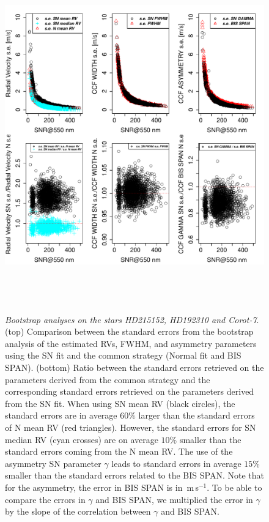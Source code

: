 \documentclass{aa}
\def\ms{\hbox{\,m\,s$^{-1}$}}         %
\begin{document}
\begin{figure}[htbp]
\begin{center}
\includegraphics[height = 6in]{[5]Errors_vs_SNR_all_stars.pdf} 
   \caption{\textit{Bootstrap analyses on the stars HD215152, HD192310 and Corot-7}. (top) Comparison between the standard errors from the bootstrap analysis of the estimated RVs, FWHM, and asymmetry parameters using the SN fit and the common strategy (Normal fit and BIS SPAN). (bottom) Ratio between the standard errors retrieved on the parameters derived from the common strategy and the corresponding standard errors retrieved on the parameters derived from the SN fit. When using SN mean RV (black circles), the standard errors are in average $60\%$ larger than the standard errors of N mean RV (red triangles). However, the standard errors for SN median RV (cyan crosses) are on average $10\%$ smaller than the standard errors coming from the N mean RV. 
   The use of the asymmetry SN parameter $\gamma$ leads to standard errors in average $15\%$ smaller than the standard errors related to the BIS SPAN. Note that for the asymmetry, the error in BIS SPAN is in \ms. To be able to compare the errors in $\gamma$ and BIS SPAN, we multiplied the error in $\gamma$ by the slope of the correlation between $\gamma$ and BIS SPAN.}
   \label{fig:se}
\end{center}
\end{figure}
\end{document}
